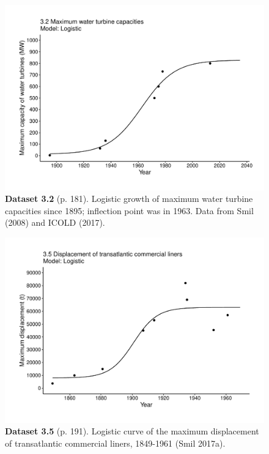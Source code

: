 \documentclass[aps,rmp,preprint,superscriptaddress,10pt,onecolumn]{article}
\begin{document}
\clearpage
\begin{figure}[h]
\includegraphics[width=\textwidth]{output/figs-ggplot/3.2.pdf}
\caption*{\textbf{Dataset 3.2} (p. 181). Logistic growth of maximum water turbine capacities since 1895; inflection point was in 1963. Data from Smil (2008) and ICOLD (2017).}
\end{figure}
	
\clearpage
\begin{figure}[h]
\includegraphics[width=\textwidth]{output/figs-ggplot/3.5.pdf}
\caption*{\textbf{Dataset 3.5} (p. 191). Logistic curve of the maximum displacement of transatlantic commercial liners, 1849-1961 (Smil 2017a).}
\end{figure}
	
\end{document}
